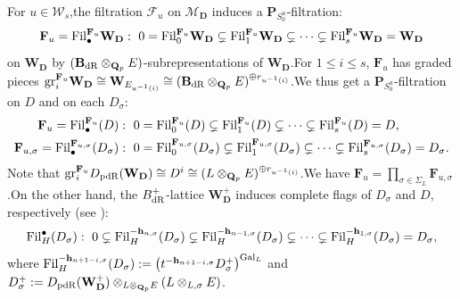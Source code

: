 \documentclass[10pt]{article}
\newcommand{\pdr}{{\rm pdR}}
\newcommand{\gal}{{\rm Gal}}
\newcommand{\fil}{{\rm Fil}}
\newcommand{\dr}{{\rm dR}}
\newcommand{\gr}{{\rm gr}}
\newcommand{\hpi}{{{\mathbf{h}}}}
\newcommand{\Dpik}{{\mathbf{D}}}
\newcommand{\bB}{{\mathbf{B}}}
\newcommand{\bF}{{\mathbf{F}}}
\newcommand{\bP}{{\mathbf{P}}}
\newcommand{\bQ}{{\mathbf{Q}}}
\newcommand{\bW}{{\mathbf{W}}}
\newcommand{\bh}{{\mathbf{h}}}
\newcommand{\cM}{\mathcal M}
\newcommand{\cF}{\mathcal F}
\newcommand{\sW}{\mathscr W}
\begin{document}
For $u\in \sW_s$,\;the filtration $\cF_u$ on $\cM_{\Dpik}$ induces a $\bP_{S^u_0}$-filtration:
\[\bF_{u}=\fil_{\bullet}^{\bF_{u}}\bW_\Dpik: \ 0 =\fil_0^{\bF_{u}}\bW_\Dpik \subsetneq \fil_1^{\bF_{u}}\bW_\Dpik \subsetneq \cdots \subsetneq \fil_{s}^{\bF_{u}}\bW_\Dpik=\bW_\Dpik\]
on $\bW_\Dpik$ by $(\bB_\dr\otimes_{\bQ_p}E)$-subrepresentations of $\bW_{\Dpik}$.\;For $1\leq i\leq s$, $\bF_{u}$ has graded pieces $\gr_i^{\bF_u}\bW_{\Dpik}\cong \bW_{E_{u^{-1}(i)}}\cong (\bB_\dr\otimes_{\bQ_p}E)^{\oplus r_{u^{-1}(i)}}$.\;We thus get a $\bP_{S^u_0}$-filtration on $D$ and on each $D_{\sigma}$:
\begin{equation}
	\begin{aligned}
		\bF_{u}=\fil_{\bullet}^{\bF_{u}}(D)&: \ 0 =\fil_0^{\bF_{u}}(D) \subsetneq \fil_1^{\bF_{u}}(D) \subsetneq \cdots \subsetneq \fil_{s}^{\bF_{u}}(D)=D,\\
		\bF_{u,\sigma}=\fil_{\bullet}^{\bF_{u,\sigma}}(D_{\sigma})&: \ 0 =\fil_0^{\bF_{u,\sigma}}(D_{\sigma}) \subsetneq \fil_1^{\bF_{u,\sigma}}(D_{\sigma}) \subsetneq \cdots \subsetneq \fil_{s}^{\bF_{u,\sigma}}(D_{\sigma})=D_{\sigma}.
	\end{aligned}
\end{equation}
Note that $\gr_i^{\bF_u}D_{\pdr}(\bW_\Dpik)\cong D^i\cong (L\otimes_{\bQ_p}E)^{\oplus r_{u^{-1}(i)}}$.\;We have $\bF_{u}=\prod_{\sigma\in \Sigma_L}\bF_{u,\sigma}$.\;On the other hand, the $B_{\dr}^+$-lattice $\bW^+_\Dpik$ induces complete flags of $D_{\sigma}$ and $D$, respectively (see \cite[Section 6.3]{Ding2021}):
\begin{equation}
	\begin{aligned}
		\fil^{\bullet}_{H}(D_{\sigma})&: \ 0 \subsetneq \fil^{-\hpi_{n,\sigma}}_{H} (D_{\sigma}) \subsetneq \fil^{-\hpi_{n-1,\sigma}}_{H}(D_{\sigma}) \subsetneq \cdots \subsetneq \fil^{{-\hpi_{1,\sigma}}}_{H}(D_{\sigma})=D_{\sigma},\\
	\end{aligned}
\end{equation}
where $\fil^{-\bh_{n+1-i,\sigma}}_{H}(D_{\sigma}):=\big(t^{-\bh_{n+1-i,\sigma}}D^+_{\sigma}\big)^{\gal_L}$ and $D^+_{\sigma}:=D_{\pdr}(\bW^+_\Dpik)\otimes_{L\otimes_{\bQ_p}E}(L\otimes_{L,\sigma}E)$.\;
\end{document}
